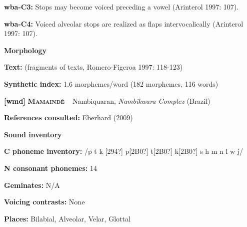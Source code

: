 \begin{styleBody}
\textbf{wba-C3: }Stops may become voiced preceding a vowel (Arinterol 1997: 107).
\end{styleBody}

\begin{styleBody}
\textbf{wba-C4: }Voiced alveolar stops are realized as flaps intervocalically (Arinterol 1997: 107).
\end{styleBody}

\begin{styleBody}
\textbf{Morphology}
\end{styleBody}

\begin{styleBody}
\textbf{Text:} (fragments of texts, Romero-Figeroa 1997: 118-123)
\end{styleBody}

\begin{styleBody}
\textbf{Synthetic index: }1.6 morphemes/word (182 morphemes, 116 words)
\end{styleBody}

\clearpage\begin{styleBody}
\textbf{[wmd] }\textbf{\textsc{Mamaindê}}\textbf{\ \ }Nambiquaran, \textit{Nambikwara Complex} (Brazil)
\end{styleBody}

\begin{styleBody}
\textbf{References consulted: }Eberhard (2009)
\end{styleBody}

\begin{styleBody}
\textbf{Sound inventory}
\end{styleBody}

\begin{styleBody}
\textbf{C phoneme inventory:} /p t k [294?] p[2B0?] t[2B0?] k[2B0?] s h m n l w j/
\end{styleBody}

\begin{styleBody}
\textbf{N consonant phonemes:} 14
\end{styleBody}

\begin{styleBody}
\textbf{Geminates:} N/A
\end{styleBody}

\begin{styleBody}
\textbf{Voicing contrasts:} None
\end{styleBody}

\begin{styleBody}
\textbf{Places:} Bilabial, Alveolar, Velar, Glottal
\end{styleBody}


